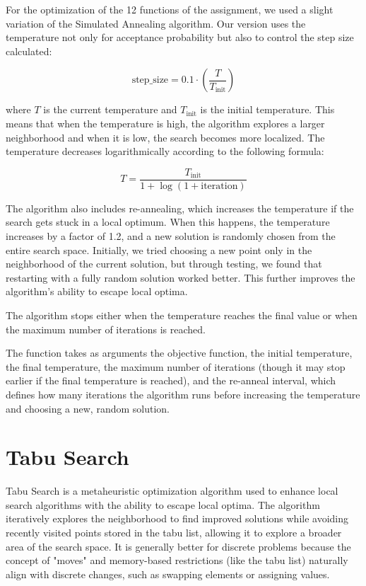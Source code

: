 \documentclass{report}
\begin{document}
For the optimization of the 12 functions of the assignment, we used a slight variation of the Simulated Annealing algorithm. Our version uses the temperature not only for acceptance probability but also to control the step size calculated:

\[
\text{step\_size} = 0.1 \cdot \left(\frac{T}{T_{\text{init}}}\right)
\]

where \(T\) is the current temperature and \(T_{\text{init}}\) is the initial temperature. This means that when the temperature is high, the algorithm explores a larger neighborhood and when it is low, the search becomes more localized. The temperature decreases logarithmically according to the following formula:

\[
T = \frac{T_{\text{init}}}{1 + \log(1 + \text{iteration})}
\]

The algorithm also includes re-annealing, which increases the temperature if the search gets stuck in a local optimum. When this happens, the temperature increases by a factor of 1.2, and a new solution is randomly chosen from the entire search space. Initially, we tried choosing a new point only in the neighborhood of the current solution, but through testing, we found that restarting with a fully random solution worked better. This further improves the algorithm’s ability to escape local optima.

The algorithm stops either when the temperature reaches the final value or when the maximum number of iterations is reached.

The function takes as arguments the objective function, the initial temperature, the final temperature, the maximum number of iterations (though it may stop earlier if the final temperature is reached), and the re-anneal interval, which defines how many iterations the algorithm runs before increasing the temperature and choosing a new, random solution.

\section*{Tabu Search}

Tabu Search is a metaheuristic optimization algorithm used to enhance local search algorithms with the ability to escape local optima. The algorithm iteratively explores the neighborhood to find improved solutions while avoiding recently visited points stored in the tabu list, allowing it to explore a broader area of the search space. It is generally better for discrete problems because the concept of "moves" and memory-based restrictions (like the tabu list) naturally align with discrete changes, such as swapping elements or assigning values.
\end{document}
